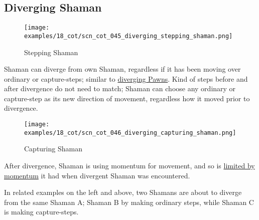 \clearpage %

\subsection*{Diverging Shaman}
\label{sec:Conquest of Tlalocan/Shaman/Movement/Diverging Shaman}

\vspace*{-0.7\baselineskip}
\noindent
\begin{wrapfigure}[10]{l}{0.4\textwidth}
\centering
\texttt{[image: examples/18\_cot/scn\_cot\_045\_diverging\_stepping\_shaman.png]}
\vspace*{-0.4\baselineskip}
\caption{Stepping Shaman}
\label{fig:scn_cot_045_diverging_stepping_shaman}
\end{wrapfigure}
Shaman can diverge from own Shaman, regardless if it has been moving over ordinary
or capture-steps; similar to
\hyperref[fig:scn_cot_034_diverging_pawn_init]{diverging Pawns}.\newline
\indent
Kind of steps before and after divergence do not need to match; Shaman can choose
any ordinary or capture-step as its new direction of movement, regardless how it
moved prior to divergence.

\noindent
\begin{wrapfigure}[11]{l}{0.4\textwidth}
\centering
\texttt{[image: examples/18\_cot/scn\_cot\_046\_diverging\_capturing\_shaman.png]}
\vspace*{-0.4\baselineskip}
\caption{Capturing Shaman}
\label{fig:scn_cot_046_diverging_capturing_shaman}
\end{wrapfigure}
After divergence, Shaman is using momentum for movement, and so is
\hyperref[fig:scn_cot_031_own_shaman_is_divergent_end]{limited by momentum} it had
when divergent Shaman was encountered.

In related examples on the left and above, two Shamans are about to diverge from the
same Shaman A; Shaman B by making ordinary steps, while Shaman C is making capture-steps.

\clearpage %

